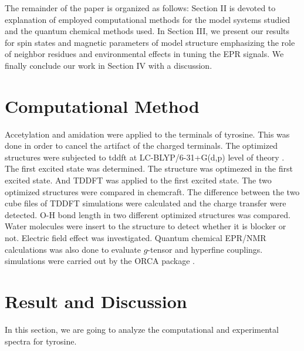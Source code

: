 \documentclass[]{interact}
\theoremstyle{plain}%
\theoremstyle{definition}
\theoremstyle{remark}
\begin{document}






The remainder of the paper is organized as follows: Section II is devoted to explanation of employed computational methods for the model systems studied and the quantum chemical methods used. In Section III, we present our results for spin states and magnetic parameters of model structure emphasizing the role of neighbor residues and environmental effects in tuning the EPR signals. We finally conclude our work in Section IV with a discussion.




\section{Computational Method}
Accetylation and amidation were applied to the terminals of tyrosine. This was done in order to cancel the artifact of the charged terminals.
The optimized structures were subjected to tddft at LC-BLYP/6-31+G(d,p) level of theory \cite{Iikura2001}.
The first excited state was determined.
The structure was optimezed in the first excited state.
And TDDFT was applied to the first excited state. 
The two optimized structures were compared in chemcraft.
The difference between the two cube files of TDDFT simulations were calculated and the charge transfer were detected. 
O-H bond length in two different optimized structures was compared.
Water molecules were insert to the structure to detect whether it is blocker or not.
Electric field effect was investigated.
Quantum chemical EPR/NMR calculations was also done to evaluate $g$-tensor and hyperfine couplings. simulations were carried out by the ORCA package \cite{neese2018software}.


\section{Result and Discussion}
In this section, we are going to analyze the computational and experimental spectra for tyrosine. 
\end{document}
